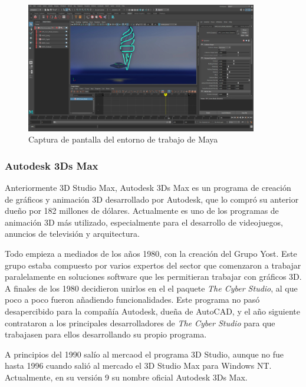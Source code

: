 \begin{figure}[!h]
\begin{center}
\includegraphics[width=0.9\textwidth]{imagenes/2/maya.jpg}
\caption{Captura de pantalla del entorno de trabajo de Maya}
\label{fig:maya}
\end{center}
\end{figure}

\subsubsection{Autodesk 3Ds Max}

Anteriormente 3D Studio Max, Autodesk 3Ds Max es un programa de creación de gráficos y animación 3D desarrollado por Autodesk, que lo compró su anterior dueño por 182 millones de dólares. Actualmente es uno de los programas de animación 3D más utilizado, especialmente para el desarrollo de videojuegos, anuncios de televisión y arquitectura.

Todo empieza a mediados de los años 1980, con la creación del Grupo Yost. Este grupo estaba compuesto por varios expertos del sector que comenzaron a trabajar paralelamente en soluciones software que les permitieran trabajar con gráficos 3D. A finales de los 1980 decidieron unirlos en el el paquete \textit{The Cyber Studio}, al que poco a poco fueron añadiendo funcionalidades. Este programa no pasó desapercibido para la compañía Autodesk, dueña de AutoCAD, y el año siguiente contrataron a los principales desarrolladores de \textit{The Cyber Studio} para que trabajasen para ellos desarrollando su propio programa.

A principios del 1990 salío al mercaod el programa 3D Studio, aunque no fue hasta 1996 cuando salió al mercado el 3D Studio Max para Windows NT. Actualmente, en su versión 9 su nombre oficial Autodesk 3Ds Max.

